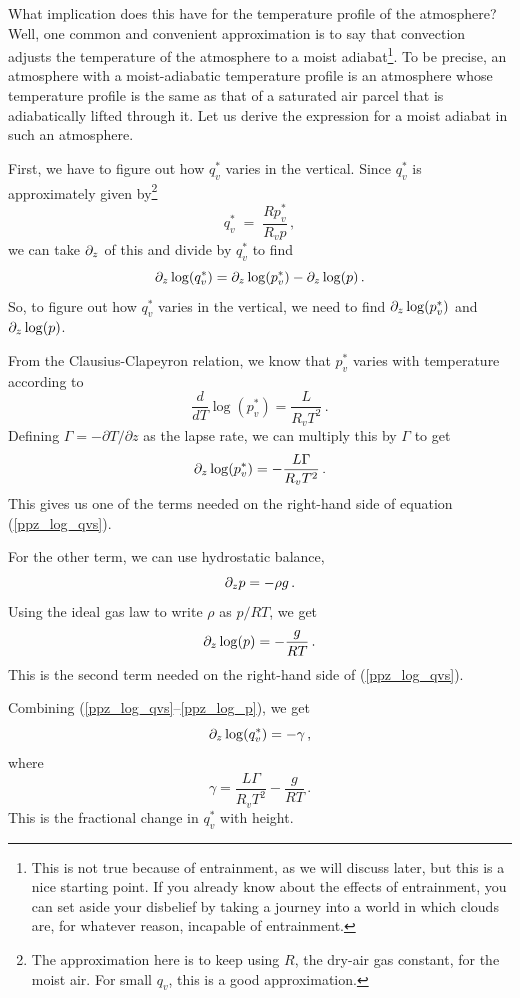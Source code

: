 \documentclass[12pt]{article}
\begin{document}
What implication does this have for the temperature profile of the atmosphere?  Well, one common and convenient approximation is to say that convection adjusts the temperature of the atmosphere to a moist adiabat\footnote{This is not true because of entrainment, as we will discuss later, but this is a nice starting point.  If you already know about the effects of entrainment, you can set aside your disbelief by taking a journey into a world in which clouds are, for whatever reason, incapable of entrainment.}.  To be precise, an atmosphere with a moist-adiabatic temperature profile is an atmosphere whose temperature profile is the same as that of a saturated air parcel that is adiabatically lifted through it.  Let us derive the expression for a moist adiabat in such an atmosphere.


First, we have to figure out how $q_v^*$ varies in the vertical.  Since $q_v^*$ is approximately given by\footnote{The approximation here is to keep using $R$, the dry-air gas constant, for the moist air.  For small $q_v$, this is a good approximation.}
\[
q_v^* \; = \; \frac{Rp_v^*}{R_v p} \, ,
\]
we can take $\partial_z$ of this and divide by $q_v^*$ to find
\begin{equation}
\partial_z \log(q_v^*) = \partial_z \log(p_v^*) - \partial_z \log(p) \, . \label{ppz_log_qvs}
\end{equation}
So, to figure out how $q_v^*$ varies in the vertical, we need to find $\partial_z \log(p_v^*)$ and $\partial_z \log(p)$.


From the Clausius-Clapeyron relation, we know that $p_v^*$ varies with temperature according to
\[
\frac{d}{dT} \log(p_v^*) = \frac{L}{R_v T^2} \, .
\]
Defining $\Gamma = -\partial T / \partial z$ as the lapse rate, we can multiply this by $\Gamma$ to get
\begin{equation}
\partial_z \log(p_v^*) = - \frac{L\Gamma}{R_v T^2} \, . \label{ppz_log_pvs}
\end{equation}
This gives us one of the terms needed on the right-hand side of equation (\ref{ppz_log_qvs}).


For the other term, we can use hydrostatic balance,
\[
\partial_z p = -\rho g \, .
\]
Using the ideal gas law to write $\rho$ as $p/RT$, we get
\begin{equation}
\partial_z \log(p) = -\frac{g}{RT} \, . \label{ppz_log_p}
\end{equation}
This is the second term needed on the right-hand side of (\ref{ppz_log_qvs}).


Combining (\ref{ppz_log_qvs}--\ref{ppz_log_p}), we get
\begin{equation}
\partial_z \log(q_v^*) = -\gamma \, ,
\end{equation}
where
\begin{equation}
\gamma = \frac{L\Gamma}{R_v T^2} - \frac{g}{RT} \, . \label{gamma}
\end{equation}
This is the fractional change in $q_v^*$ with height.
\end{document}
